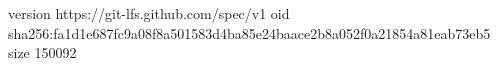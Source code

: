 version https://git-lfs.github.com/spec/v1
oid sha256:fa1d1e687fc9a08f8a501583d4ba85e24baace2b8a052f0a21854a81eab73eb5
size 150092
